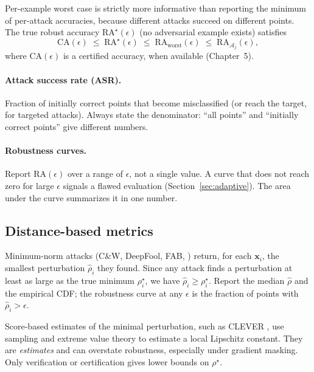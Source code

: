 \documentclass[10pt,a4paper]{extarticle}
\theoremstyle{definition}
\newcommand{\x}{\mathbf{x}}
\begin{document}
Per-example worst case is strictly more informative than reporting the minimum of per-attack accuracies, because different attacks succeed on different points. The true robust accuracy \(\mathrm{RA}^\star(\epsilon)\) (no adversarial example exists) satisfies
\begin{equation}\label{eq:sandwich}
\mathrm{CA}(\epsilon)\;\le\;\mathrm{RA}^\star(\epsilon)\;\le\;\mathrm{RA}_{\text{worst}}(\epsilon)\;\le\;\mathrm{RA}_{\mathcal{A}_j}(\epsilon),
\end{equation}
where \(\mathrm{CA}(\epsilon)\) is a certified accuracy, when available (Chapter~5).

\paragraph{Attack success rate (ASR).} Fraction of initially correct points that become misclassified (or reach the target, for targeted attacks). Always state the denominator: \enquote{all points} and \enquote{initially correct points} give different numbers.

\paragraph{Robustness curves.} Report \(\mathrm{RA}(\epsilon)\) over a range of \(\epsilon\), not a single value. A curve that does not reach zero for large \(\epsilon\) signals a flawed evaluation (Section~\ref{sec:adaptive}). The area under the curve summarizes it in one number.

\subsection{Distance-based metrics}

Minimum-norm attacks (C\&W, DeepFool, FAB, \citealp{croce2020fab}) return, for each \(\x_i\), the smallest perturbation \(\hat\rho_i\) they found. Since any attack finds a perturbation at least as large as the true minimum \(\rho^\star_i\), we have \(\hat\rho_i\ge\rho^\star_i\). Report the median \(\hat\rho\) and the empirical CDF; the robustness curve at any \(\epsilon\) is the fraction of points with \(\hat\rho_i>\epsilon\).

\begin{warnbox}
Score-based estimates of the minimal perturbation, such as CLEVER \citep{weng2018clever}, use sampling and extreme value theory to estimate a local Lipschitz constant. They are \emph{estimates} and can overstate robustness, especially under gradient masking. Only verification or certification gives lower bounds on \(\rho^\star\).
\end{warnbox}
\end{document}
